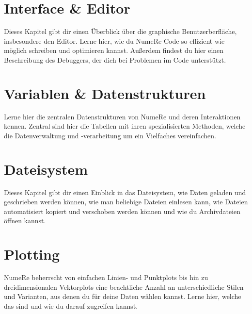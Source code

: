 \documentclass[DIV=17, parskip=half]{scrreprt}
\begin{document}
	\chapter{Interface \& Editor}
		Dieses Kapitel gibt dir einen \"Uberblick \"uber die graphische Benutzerberfl\"ache, insbesondere den Editor. Lerne hier, wie du NumeRe-Code so effizient wie m\"oglich schreiben und optimieren kannst. Au\ss erdem findest du hier einen Beschreibung des Debuggers, der dich bei Problemen im Code unterst\"utzt.
		
		
		
		
		
		
		
		
		
		
		
	\chapter{Variablen \& Datenstrukturen}
		Lerne hier die zentralen Datenstrukturen von NumeRe und deren Interaktionen kennen. Zentral sind hier die Tabellen mit ihren spezialisierten Methoden, welche die Datenverwaltung und -verarbeitung um ein Vielfaches vereinfachen.
		
		
		
		
		
		
		
		
		
	
	\chapter{Dateisystem}
		Dieses Kapitel gibt dir einen Einblick in das Dateisystem, wie Daten geladen und geschrieben werden k\"onnen, wie man beliebige Dateien einlesen kann, wie Dateien automatisiert kopiert und verschoben werden k\"onnen und wie du Archivdateien \"offnen kannst.
		
		
		
		
		
		
		
	
	\chapter{Plotting}
		NumeRe beherrscht von einfachen Linien- und Punktplots bis hin zu dreidimensionalen Vektorplots eine beachtliche Anzahl an unterschiedliche Stilen und Varianten, aus denen du f\"ur deine Daten w\"ahlen kannst. Lerne hier, welche das sind und wie du darauf zugreifen kannst.
		
		
		
		
		
		
		
		
		
		
		
		
		
		
		
		
		
	
\end{document}
